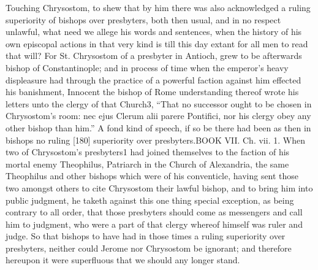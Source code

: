 Touching Chrysostom, to shew that by him there was also acknowledged a ruling superiority of bishops over presbyters, both then usual, and in no respect unlawful, what need we allege his words and sentences, when the history of his own episcopal actions in that very kind is till this day extant for all men to read that will? For St. Chrysostom of a presbyter in Antioch, grew to be afterwards bishop of Constantinople; and in process of time when the emperor’s heavy displeasure had through the practice of a powerful faction against him effected his banishment, Innocent the bishop of Rome understanding thereof wrote his letters unto the clergy of that Church3, “That no successor ought to be chosen in Chrysostom’s room: nec ejus Clerum alii parere Pontifici, nor his clergy obey any other bishop than him.” A fond kind of speech, if so be there had been as then in bishops no ruling [180] superiority over presbyters.BOOK VII. Ch. vii. 1. When two of Chrysostom’s presbyters1 had joined themselves to the faction of his mortal enemy Theophilus, Patriarch in the Church of Alexandria, the same Theophilus and other bishops which were of his conventicle, having sent those two amongst others to cite Chrysostom their lawful bishop, and to bring him into public judgment, he taketh against this one thing special exception, as being contrary to all order, that those presbyters should come as messengers and call him to judgment, who were a part of that clergy whereof himself was ruler and judge. So that bishops to have had in those times a ruling superiority over presbyters, neither could Jerome nor Chrysostom be ignorant; and therefore hereupon it were superfluous that we should any longer stand.

